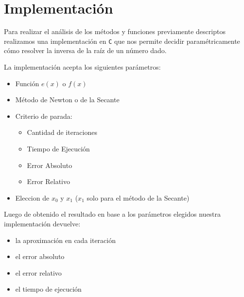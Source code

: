 
\section{Implementación}

Para realizar el análisis de los métodos y funciones previamente descriptos
realizamos una implementación en \verb|C| que nos permite decidir
paramétricamente cómo resolver la inversa de la raíz de un número dado.

La implementación acepta los siguientes parámetros:

\begin{itemize}
    \item Función $e(x)$ o $f(x)$
    \item Método de Newton o de la Secante
    \item Criterio de parada:
    \begin{itemize}
        \item Cantidad de iteraciones
        \item Tiempo de Ejecución
        \item Error Absoluto
        \item Error Relativo
    \end{itemize}
    \item Eleccion de $x_0$ y $x_1$ ($x_1$ solo para el método de la Secante)
\end{itemize}

Luego de obtenido el resultado en base a los parámetros elegidos nuestra
implementación devuelve:

\begin{itemize}
    \item la aproximación en cada iteración
    \item el error absoluto
    \item el error relativo
    \item el tiempo de ejecución
\end{itemize}


